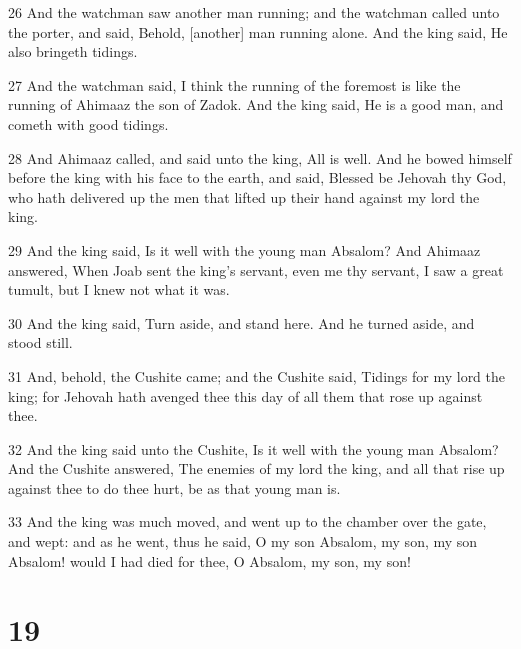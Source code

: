 \par 26 And the watchman saw another man running; and the watchman called unto the porter, and said, Behold, [another] man running alone. And the king said, He also bringeth tidings.
\par 27 And the watchman said, I think the running of the foremost is like the running of Ahimaaz the son of Zadok. And the king said, He is a good man, and cometh with good tidings.
\par 28 And Ahimaaz called, and said unto the king, All is well. And he bowed himself before the king with his face to the earth, and said, Blessed be Jehovah thy God, who hath delivered up the men that lifted up their hand against my lord the king.
\par 29 And the king said, Is it well with the young man Absalom? And Ahimaaz answered, When Joab sent the king's servant, even me thy servant, I saw a great tumult, but I knew not what it was.
\par 30 And the king said, Turn aside, and stand here. And he turned aside, and stood still.
\par 31 And, behold, the Cushite came; and the Cushite said, Tidings for my lord the king; for Jehovah hath avenged thee this day of all them that rose up against thee.
\par 32 And the king said unto the Cushite, Is it well with the young man Absalom? And the Cushite answered, The enemies of my lord the king, and all that rise up against thee to do thee hurt, be as that young man is.
\par 33 And the king was much moved, and went up to the chamber over the gate, and wept: and as he went, thus he said, O my son Absalom, my son, my son Absalom! would I had died for thee, O Absalom, my son, my son!

\chapter{19}

